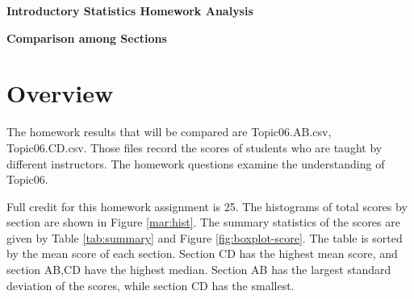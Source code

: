 \documentclass[12pt,nohyper]{tufte-handout}\usepackage[]{graphicx}\usepackage[]{color}
\begin{document}
\centerline{\Large\bf Introductory Statistics Homework Analysis}
\centerline{\bf Comparison among Sections}
\centerline{\bf }

\section{Overview}
The homework results that will be compared are Topic06.AB.csv, Topic06.CD.csv. Those files record the scores of students who are taught by different instructors. The homework questions examine the understanding of Topic06.

Full credit for this homework assignment is 25. The histograms of total scores by section are shown in Figure \ref{mar:hist}. The summary statistics of the scores are given by Table \ref{tab:summary} and Figure \ref{fig:boxplot-score}. The table is sorted by the mean score of each section. Section CD has the highest mean score, and section AB,CD   have the highest median. Section AB has the largest standard deviation of the scores, while section CD has the smallest.
\end{document}

